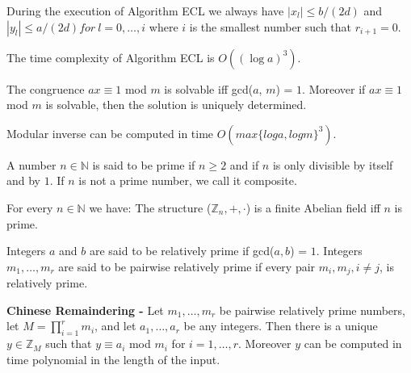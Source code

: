 \documentclass[a4paper]{article}
\begin{document}
\begin{samepage}
\begin{theorem}
During the execution of Algorithm ECL we always have $|x_{\mathit{l}}| \leq b / (2d)$ and $|y_{\mathit{l}}| \leq a/(2d) for\ \mathit{l} = 0, \ldots, i$ where $i$ is the smallest number such that $r_{i+1} = 0$.
\end{theorem}
\end{samepage}


\begin{theorem}
The time complexity of Algorithm ECL is $O((\log{a})^{3})$.
\end{theorem}


\begin{theorem}
The congruence $ax \equiv 1$ mod $m$ is solvable iff gcd($a$, $m$) = $1$. Moreover if $ax \equiv 1$ mod $m$ is solvable, then the solution is uniquely determined.
\end{theorem}


\begin{theorem}
Modular inverse can be computed in time $O(max\{log{a}, log{m}\}^{3})$.
\end{theorem}


\begin{definition}
A number $n \in \mathbb{N}$ is said to be prime if $n \geq 2$ and if $n$ is only divisible by itself and by $1$. If $n$ is not a prime number, we call it composite.
\end{definition}


\begin{corollary}
For every $n \in \mathbb{N}$ we have: The structure ($\mathbb{Z}_{n}, +, \cdot$) is a finite Abelian field iff $n$ is prime.
\end{corollary}


\begin{definition}
Integers $a$ and $b$ are said to be relatively prime if gcd($a, b$) = $1$. Integers $m_{1}, \ldots, m_{r}$ are said to be pairwise relatively prime if every pair $m_{i}, m_{j}, i \neq j$, is relatively prime.
\end{definition}


\begin{theorem}
\textbf{Chinese Remaindering -}
Let $m_{1}, \ldots, m_{r}$ be pairwise relatively prime numbers, let $M = \prod^{r}_{i=1}m_{i}$, and let $a_{1}, \ldots, a_{r}$ be any integers. Then there is a unique $y \in \mathbb{Z}_{M}$ such that $ y \equiv a_{i}$ mod $m_{i}$ for $i = 1, \ldots, r$. Moreover $y$ can be computed in time polynomial in the length of the input.
\end{theorem}
\end{document}
